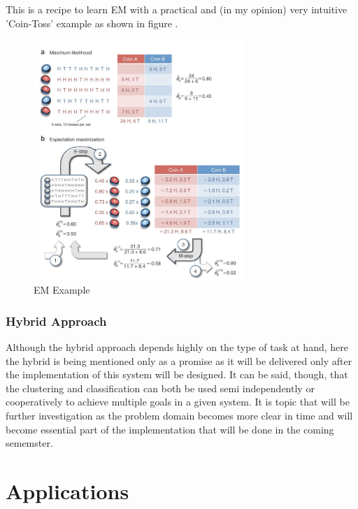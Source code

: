 \documentclass[12pt]{book}
\begin{document}
This is a recipe to learn EM with a practical and (in my opinion) very intuitive 'Coin-Toss' example as shown in figure \cite{blog-em}.
\begin{figure}[H]
\centering
\includegraphics[width=8cm]{em.jpg}
\caption{EM Example\cite{blog-em}}
\label{fig:figure5}
\end{figure}

\subsection{Hybrid Approach}
Although the hybrid approach depends highly on the type of task at hand, here the hybrid is being mentioned only as a promise as it will be delivered only after the implementation of this system will be designed. It can be said, though, that the 
clustering and classification can both be used semi independently or cooperatively to achieve multiple goals in a given system. It is topic that will be further investigation as the problem domain becomes more clear in time and will become essential 
part of the implementation that will be done in the coming sememster.


\chapter{Applications}
\end{document}
